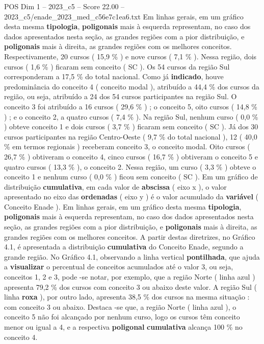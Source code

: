 \begin{textsample}{POS Dim 1 – 2023\_c5 – Score 22.00 – 2023\_c5/enade\_2023\_med\_c56e7c1ea6.txt}
Em linhas gerais, em um gráfico desta mesma \textbf{tipologia}, \textbf{poligonais} mais à esquerda representam, no caso dos dados apresentados nesta seção, as grandes regiões com a pior distribuição, e \textbf{poligonais} mais à direita, as grandes regiões com os melhores conceitos.
Respectivamente, 20 cursos ( 15,9 \% ) e nove cursos ( 7,1 \% ).
Nessa região, dois cursos ( 1,6 \% ) ficaram sem conceito ( SC ).
Os 54 cursos da região Sul corresponderam a 17,5 \% do total nacional.
Como já \textbf{indicado}, houve predominância do conceito 4 ( conceito modal ), atribuído a 44,4 \% dos cursos da região, ou seja, atribuído a 24 dos 54 cursos participantes na região Sul.
O conceito 3 foi atribuído a 16 cursos ( 29,6 \% ) ; o conceito 5, oito cursos ( 14,8 \% ) ; e o conceito 2, a quatro cursos ( 7,4 \% ).
Na região Sul, nenhum curso ( 0,0 \% ) obteve conceito 1 e dois cursos ( 3,7 \% ) ficaram sem conceito ( SC ).
Já dos 30 cursos participantes na região Centro-Oeste ( 9,7 \% do total nacional ), 12 ( 40,0 \% em termos regionais ) receberam conceito 3, o conceito modal.
Oito cursos ( 26,7 \% ) obtiveram o conceito 4, cinco cursos ( 16,7 \% ) obtiveram o conceito 5 e quatro cursos ( 13,3 \% ), o conceito 2.
Nessa região, um curso ( 3,3 \% ) obteve o conceito 1 e nenhum curso ( 0,0 \% ) ficou sem conceito ( SC ).
Em um gráfico de distribuição \textbf{cumulativa}, em cada valor de \textbf{abscissa} ( eixo x ), o valor apresentado no eixo das \textbf{ordenadas} ( eixo y ) é o valor acumulado da \textbf{variável} ( Conceito Enade ).
Em linhas gerais, em um gráfico desta mesma \textbf{tipologia}, \textbf{poligonais} mais à esquerda representam, no caso dos dados apresentados nesta seção, as grandes regiões com a pior distribuição, e \textbf{poligonais} mais à direita, as grandes regiões com os melhores conceitos.
A partir destas diretrizes, no Gráfico 4.1, é apresentada a distribuição \textbf{cumulativa} do Conceito Enade, segundo a grande região.
No Gráfico 4.1, observando a linha vertical \textbf{pontilhada}, que ajuda a \textbf{visualizar} o percentual de conceitos acumulados até o valor 3, ou seja, conceitos 1, 2 e 3, pode -se notar, por exemplo, que a região Norte ( linha azul ) apresenta 79,2 \% dos cursos com conceito 3 ou abaixo deste valor.
A região Sul ( linha \textbf{roxa} ), por outro lado, apresenta 38,5 \% dos cursos na mesma situação : com conceito 3 ou abaixo.
Destaca -se que, a região Norte ( linha azul ), o conceito 5 não foi alcançado por nenhum curso, logo os cursos têm conceito menor ou igual a 4, e a respectiva \textbf{poligonal} \textbf{cumulativa} alcança 100 \% no conceito 4.

\end{textsample}
